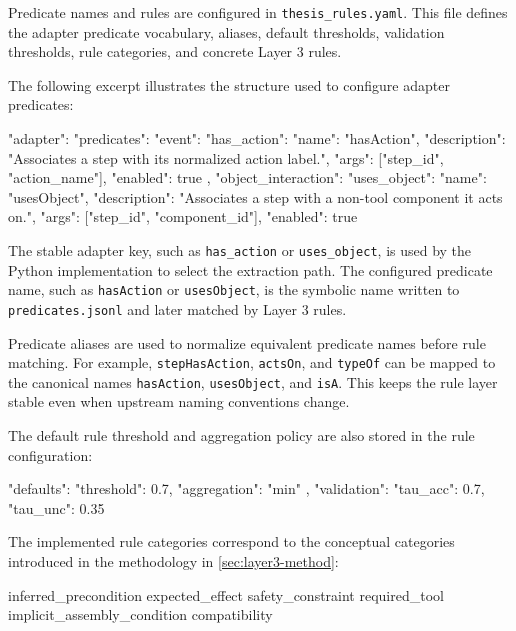 Predicate names and rules are configured in \texttt{thesis\_rules.yaml}. This file defines the adapter predicate vocabulary, aliases, default thresholds, validation thresholds, rule categories, and concrete Layer 3 rules.

The following excerpt illustrates the structure used to configure adapter predicates:

\begin{Code}
"adapter": {
  "predicates": {
    "event": {
      "has_action": {
        "name": "hasAction",
        "description": "Associates a step with its normalized action label.",
        "args": ["step_id", "action_name"],
        "enabled": true
      }
    },
    "object_interaction": {
      "uses_object": {
        "name": "usesObject",
        "description": "Associates a step with a non-tool component it acts on.",
        "args": ["step_id", "component_id"],
        "enabled": true
      }
    }
  }
}
\end{Code}

The stable adapter key, such as \texttt{has\_action} or \texttt{uses\_object}, is used by the Python implementation to select the extraction path. The configured predicate name, such as \texttt{hasAction} or \texttt{usesObject}, is the symbolic name written to \texttt{predicates.jsonl} and later matched by Layer 3 rules.

Predicate aliases are used to normalize equivalent predicate names before rule matching. For example, \texttt{stepHasAction}, \texttt{actsOn}, and \texttt{typeOf} can be mapped to the canonical names \texttt{hasAction}, \texttt{usesObject}, and \texttt{isA}. This keeps the rule layer stable even when upstream naming conventions change.

The default rule threshold and aggregation policy are also stored in the rule configuration:

\begin{Code}
"defaults": {
  "threshold": 0.7,
  "aggregation": "min"
},
"validation": {
  "tau_acc": 0.7,
  "tau_unc": 0.35
}
\end{Code}

The implemented rule categories correspond to the conceptual categories introduced in the methodology in \cref{sec:layer3-method}:

\begin{Code}
    inferred_precondition
    expected_effect
    safety_constraint
    required_tool
    implicit_assembly_condition
    compatibility
\end{Code}

